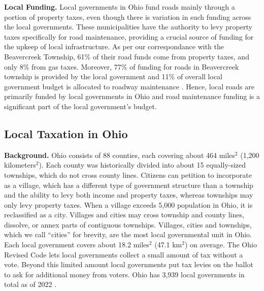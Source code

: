 {\bf Local Funding.} Local governments in Ohio fund roads mainly through a portion of property taxes, even though there is variation in such funding across the local governments. These municipalities have the authority to levy property taxes specifically for road maintenance, providing a crucial source of funding for the upkeep of local infrastructure. As per our correspondance with the Beavercreek Township, 61\% of their road funds come from property taxes, and only 8\% from gas taxes. Moreover, 77\% of funding for roads in Beavercreek township is provided by the local government and 11\% of overall local government budget is allocated to roadway maintenance \citep{schroeder2025}. Hence, local roads are primarily funded by local governments in Ohio and road maintenance funding is a significant part of the local government's budget.


\subsection{Local Taxation in Ohio}

{\bf Background.} Ohio consists of 88 counties, each covering about 464 miles$^2$ (1,200 kilometers$^2$). Each county was historically divided into about 15 equally-sized townships, which do not cross county lines. Citizens can petition to incorporate as a village, which has a different type of government structure than a township and the ability to levy both income and property taxes, whereas townships may only levy property taxes. When a village exceeds 5,000 population in Ohio, it is reclassified as a city. Villages and cities may cross township and county lines, dissolve, or annex parts of contiguous townships. Villages, cities and townships, which we call “cities” for brevity, are the most local governmental unit in Ohio. Each local government covers about 18.2 miles$^2$ (47.1 km$^2$) on average. The Ohio Revised Code lets local governments collect a small amount of tax without a vote. Beyond this limited amount local governments put tax levies on the ballot to ask for additional money from voters. Ohio has 3,939 local governments in total as of 2022 \citep{stlouisfed2024local}.  


